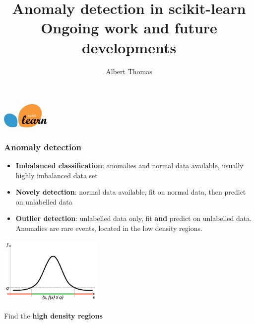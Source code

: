 \documentclass[slidetop,11pt]{beamer}
\title{{\large Anomaly detection in scikit-learn} \\ {\normalfont \small{Ongoing work and future developments}}}
\author{Albert Thomas}
\institute{T\'el\'ecom ParisTech - Huawei Technologies}
\begin{document}
\captionsetup[subfigure]{labelformat=empty}

\begin{frame}
\includegraphics[width=2.3cm]{img/scikit-learn-logo-notext.png}
\titlepage

\end{frame}


\begin{frame}
\frametitle{Anomaly detection}

\begin{itemize}
\item \textbf{Imbalanced classification}: anomalies and normal data available, usually highly imbalanced data set

\item \textbf{Novely detection}: normal data available, fit on normal data, then predict on unlabelled data

\item \textbf{Outlier detection}: unlabelled data only, fit \textbf{and} predict on unlabelled data. Anomalies are rare events, located in the low density regions.
\end{itemize}

\begin{center}
\includegraphics[width=5cm]{dls3.pdf}
\end{center}

\begin{center}
Find the \textbf{high density regions}
\end{center}

\end{frame}
\end{document}
